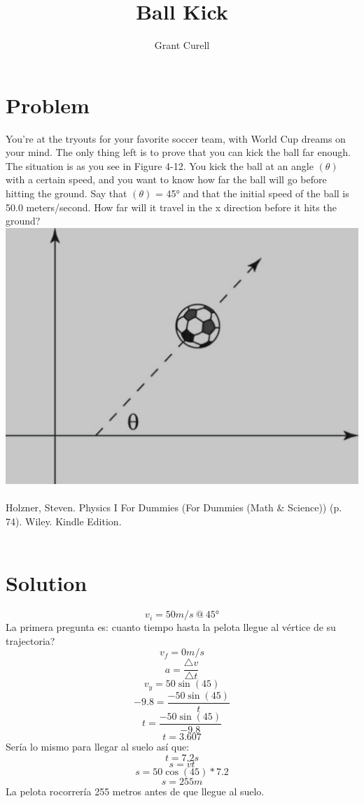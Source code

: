\documentclass{article}
\title{Ball Kick}
\author{Grant Curell}
\begin{document}
\maketitle{}
\section{Problem}
You’re at the tryouts for your favorite soccer team, with World Cup dreams on your mind. The only thing left is to prove that you can kick the ball far enough. The situation is as you see in Figure 4-12. You kick the ball at an angle $(\theta)$ with a certain speed, and you want to know how far the ball will go before hitting the ground. Say that $(\theta)$ = \ang{45} and that the initial speed of the ball is 50.0 meters/second. How far will it travel in the x direction before it hits the ground?
\includegraphics[width=\columnwidth]{image}
\\\\
Holzner, Steven. Physics I For Dummies (For Dummies (Math \& Science)) (p. 74). Wiley. Kindle Edition.
\\\\
\section{Solution}
\[ v_i=50m/s\ @\ \ang{45} \]
La primera pregunta es: cuanto tiempo hasta la pelota llegue al vértice de su trajectoria?
\[ v_f=0m/s \]
\[ a=\frac{\triangle{v}}{\triangle{t}} \]
\[ v_y=50\sin(45) \]
\[ -9.8 = \frac{-50\sin(45)}{t} \]
\[ t=\frac{-50\sin(45)}{-9.8} \]
\[ t=3.607 \]
Sería lo mismo para llegar al suelo así que:
\[ t=7.2s \]
\[ s=\bar{v}t \]
\[ s=50\cos(45)*7.2 \]
\[ s = 255m \]
La pelota rocorrería 255 metros antes de que llegue al suelo.
\end{document}
